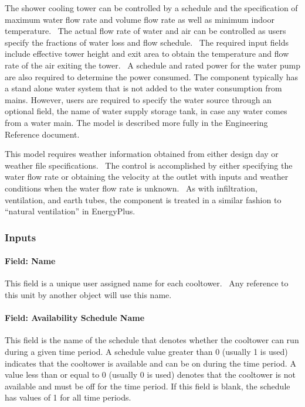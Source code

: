 The shower cooling tower can be controlled by a schedule and the specification of maximum water flow rate and volume flow rate as well as minimum indoor temperature.~ The actual flow rate of water and air can be controlled as users specify the fractions of water loss and flow schedule.~ The required input fields include effective tower height and exit area to obtain the temperature and flow rate of the air exiting the tower.~ A schedule and rated power for the water pump are also required to determine the power consumed. The component typically has a stand alone water system that is not added to the water consumption from mains. However, users are required to specify the water source through an optional field, the name of water supply storage tank, in case any water comes from a water main. The model is described more fully in the Engineering Reference document.

This model requires weather information obtained from either design day or weather file specifications. ~The control is accomplished by either specifying the water flow rate or obtaining the velocity at the outlet with inputs and weather conditions when the water flow rate is unknown.~ As with infiltration, ventilation, and earth tubes, the component is treated in a similar fashion to ``natural ventilation'' in EnergyPlus.

\subsubsection{Inputs}\label{inputs-8-002}

\paragraph{Field: Name}\label{field-name-8-002}

This field is a unique user assigned name for each cooltower.~ Any reference to this unit by another object will use this name.

\paragraph{Field: Availability Schedule Name}\label{field-availability-schedule-name-000}

This field is the name of the schedule that denotes whether the cooltower can run during a given time period. A schedule value greater than 0 (usually 1 is used) indicates that the cooltower is available and can be on during the time period. A value less than or equal to 0 (usually 0 is used) denotes that the cooltower is not available and must be off for the time period. If this field is blank, the schedule has values of 1 for all time periods.

